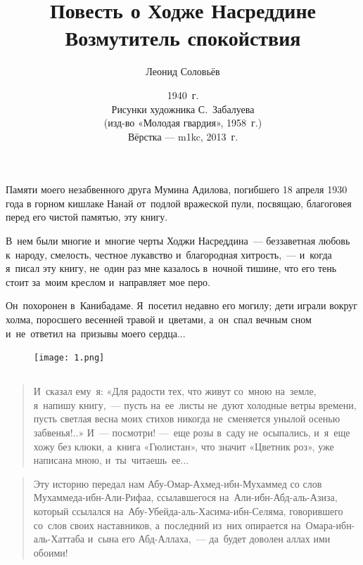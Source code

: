 \documentclass[12pt,a4paper]{book}
\title{\textbf{Повесть о Ходже Насреддине} \\ Возмутитель спокойствия}
\author{Леонид Соловьёв}
\date{1940~г. \\ Рисунки художника С.~Забалуева \\ (изд-во «Молодая гвардия», 1958~г.) \\ Вёрстка --- m1kc, 2013~г.}
\begin{document}
\maketitle

Памяти моего незабвенного друга Мумина Адилова, погибшего 18 апреля 1930 года в горном кишлаке Нанай от~подлой вражеской пули, посвящаю, благоговея перед его чистой памятью, эту книгу.

В~нем были многие и~многие черты Ходжи Насреддина~— беззаветная любовь к~народу, смелость, честное лукавство и~благородная хитрость,~— и~когда я~писал эту книгу, не~один раз мне казалось в~ночной тишине, что его тень стоит за~моим креслом и~направляет мое перо.

Он~похоронен в~Канибадаме. Я~посетил недавно его могилу; дети играли вокруг холма, поросшего весенней травой и~цветами, а~он~спал вечным сном и~не~ответил на~призывы моего сердца...

\begin{figure}[p]
\centering
\texttt{[image: 1.png]}
\end{figure}

\chapter*{}

\begin{quote}
И~сказал ему~я: «Для радости тех, что живут со~мною на~земле, я~напишу книгу,~— пусть на~ее~листы не~дуют холодные ветры времени, пусть светлая весна моих стихов никогда не~сменяется унылой осенью забвенья!..» И~— посмотри! —~еще розы в~саду не~осыпались, и~я~еще хожу без клюки, а~книга «Гюлистан», что значит «Цветник роз», уже написана мною, и~ты~читаешь~ее...
\end{quote}

\begin{quote}
Эту историю передал нам Абу-Омар-Ахмед-ибн-Мухаммед со слов Мухаммеда-ибн-Али-Рифаа, ссылавшегося на~Али-ибн-Абд-аль-Азиза, который ссылался на~Абу-Убейда-аль-Хасима-ибн-Селяма, говорившего со~слов своих наставников, а~последний из~них опирается на~Омара-ибн-аль-Хаттаба и~сына его Абд-Аллаха,~— да~будет доволен аллах ими обоими!
\end{quote}

\part{}
\end{document}
